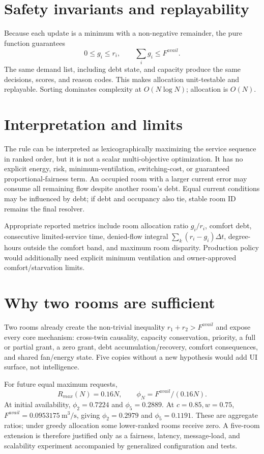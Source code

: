 \section{Safety invariants and replayability}
Because each update is a minimum with a non-negative remainder, the pure function guarantees
\begin{equation}0\le g_i\le r_i,\qquad \sum_i g_i\le F^{avail}.\end{equation}
The same demand list, including debt state, and capacity produce the same decisions, scores, and reason codes. This makes allocation unit-testable and replayable. Sorting dominates complexity at $O(N\log N)$; allocation is $O(N)$.

\section{Interpretation and limits}
The rule can be interpreted as lexicographically maximizing the service sequence in ranked order, but it is not a scalar multi-objective optimization. It has no explicit energy, risk, minimum-ventilation, switching-cost, or guaranteed proportional-fairness term. An occupied room with a larger current error may consume all remaining flow despite another room's debt. Equal current conditions may be influenced by debt; if debt and occupancy also tie, stable room ID remains the final resolver.

Appropriate reported metrics include room allocation ratio $g_i/r_i$, comfort debt, consecutive limited-service time, denied-flow integral $\sum_k(r_i-g_i)\Delta t$, degree-hours outside the comfort band, and maximum room disparity. Production policy would additionally need explicit minimum ventilation and owner-approved comfort/starvation limits.

\section{Why two rooms are sufficient}
Two rooms already create the non-trivial inequality $r_1+r_2>F^{avail}$ and expose every core mechanism: cross-twin causality, capacity conservation, priority, a full or partial grant, a zero grant, debt accumulation/recovery, comfort consequences, and shared fan/energy state. Five copies without a new hypothesis would add UI surface, not intelligence.

For future equal maximum requests,
\begin{equation}R_{max}(N)=0.16N,\qquad \phi_N=F^{avail}/(0.16N).\end{equation}
At initial availability, $\phi_2=0.7224$ and $\phi_5=0.2889$. At $c=0.85,w=0.75$, $F^{avail}=\SI{0.0953175}{\meter\cubed\per\second}$, giving $\phi_2=0.2979$ and $\phi_5=0.1191$. These are aggregate ratios; under greedy allocation some lower-ranked rooms receive zero. A five-room extension is therefore justified only as a fairness, latency, message-load, and scalability experiment accompanied by generalized configuration and tests.
